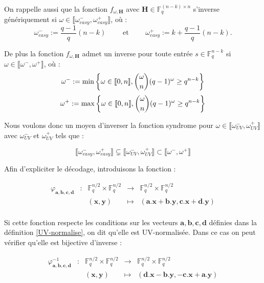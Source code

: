 \documentclass[12pt]{article}
\theoremstyle{plain}
\theoremstyle{definition}
\newcommand{\F}{\mathbb{F}}
\begin{document}
\noindent On rappelle aussi que la fonction $f_{\omega,\mathbf{H}}$ avec $\mathbf{H} \in \F_q^{(n-k)\times n}$ s'inverse génériquement si $\omega \in \llbracket\omega_{easy}^-,\omega_{easy}^+\rrbracket$, où :
$$ \omega_{easy}^- := \frac{q-1}{q}(n-k) \qquad \text{ et }\qquad  \omega_{easy}^+ := k + \frac{q-1}{q}(n-k).$$




\noindent De plus la fonction $f_{\omega,\mathbf{H}}$ admet un inverse pour toute entrée $s \in \F_q^{n-k}$ si $\omega \in \llbracket\omega^-,\omega^+\rrbracket$, où :
$$\omega^- := \min\left\{\omega\in \llbracket0,n\rrbracket , \dbinom{\omega}{n}(q-1)^{\omega} \geq q^{n-k}\right\} $$
$$\omega^+ := \max\left\{\omega\in \llbracket0,n\rrbracket , \dbinom{\omega}{n}(q-1)^{\omega} \geq q^{n-k}\right\}$$


\noindent Nous voulons donc un moyen d'inverser la fonction syndrome pour $\omega \in \llbracket\omega_{UV}^-,\omega_{UV}^+\rrbracket$ avec $\omega_{UV}^-$ et $\omega_{UV}^+$ tels que :

$$\llbracket\omega_{easy}^-,\omega_{easy}^+\rrbracket \subsetneq \llbracket\omega_{UV}^-,\omega_{UV}^+\rrbracket \subset  \llbracket\omega^-,\omega^+\rrbracket$$


\noindent Afin d'expliciter le décodage, introduisons la fonction :

$$\begin{array}{ccccc}
\varphi_{\mathbf{a},\mathbf{b},\mathbf{c},\mathbf{d}} & : & \F_q^{n/2} \times  \F_q^{n/2} & \to & \F_q^{n/2} \times  \F_q^{n/2} \\
 & & (\mathbf{x} , \mathbf{y}) & \mapsto &  (\mathbf{a}.\mathbf{x} + \mathbf{b}.\mathbf{y}, \mathbf{c}.\mathbf{x} + \mathbf{d}.\mathbf{y}) \\
\end{array}$$

\noindent Si cette fonction respecte les conditions sur les vecteurs $\mathbf{a},\mathbf{b},\mathbf{c},\mathbf{d}$ définies dans la définition \ref{UV-normalise}, on dit qu'elle est UV-normalisée. Dans ce cas on peut vérifier qu'elle est bijective d'inverse :

\vspace{0.2in}
$$\begin{array}{ccccc}
\varphi^{-1}_{\mathbf{a},\mathbf{b},\mathbf{c},\mathbf{d}} & : & \F_q^{n/2} \times  \F_q^{n/2} & \to & \F_q^{n/2} \times  \F_q^{n/2} \\
 & & (\mathbf{x} , \mathbf{y}) & \mapsto &  (\mathbf{d}.\mathbf{x} - \mathbf{b}.\mathbf{y}, -\mathbf{c}.\mathbf{x} + \mathbf{a}.\mathbf{y}) \\
\end{array}$$
\end{document}
